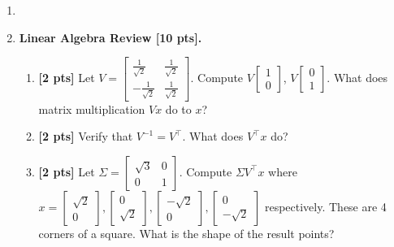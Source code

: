 \documentclass{article}
\def\pts#1{\textbf{[#1 pts]}}
\newenvironment{Q}{\clearpage \item}{\phantom{s} \bigskip}
\begin{document}
\begin{enumerate}
\begin{Q}
\begin{enumerate}
    \vspace{3cm}
\end{enumerate}
  
\end{Q}



\begin{Q}
\textbf{Linear Algebra Review \pts{10}.}

\begin{enumerate}
    \item \pts2
    Let
    $V = 
    \begin{bmatrix}
        \frac1{\sqrt 2} & \frac1{\sqrt 2} \\
        -\frac1{\sqrt 2} & \frac1{\sqrt 2}
    \end{bmatrix} .$
    Compute $ V\begin{bmatrix} 1 \\ 0 \end{bmatrix}$, $ V\begin{bmatrix} 0 \\ 1 \end{bmatrix}$.
    What does matrix multiplication $Vx$ do to $x$?
    
    \vspace{3cm}
    
    \item \pts2
    Verify that $V^{-1} = V^\top$. What does $V^\top x$ do?
    
    \vspace{3cm}
    
    \item \pts2
    Let
    $\Sigma = 
    \begin{bmatrix}
        \sqrt{3} & 0 \\
        0 & 1
    \end{bmatrix} .$
    Compute $\Sigma V^\top x$ where $x = \begin{bmatrix} \sqrt{2} \\ 0 \end{bmatrix}, 
    \begin{bmatrix} 0 \\ \sqrt{2} \end{bmatrix}, 
    \begin{bmatrix} -\sqrt{2} \\ 0 \end{bmatrix}, 
    \begin{bmatrix} 0 \\ -\sqrt{2} \end{bmatrix}$ respectively. 
    These are 4 corners of a square. What is the shape of the result points? 
    

\end{enumerate}
\end{Q}
\end{enumerate}
\end{document}
